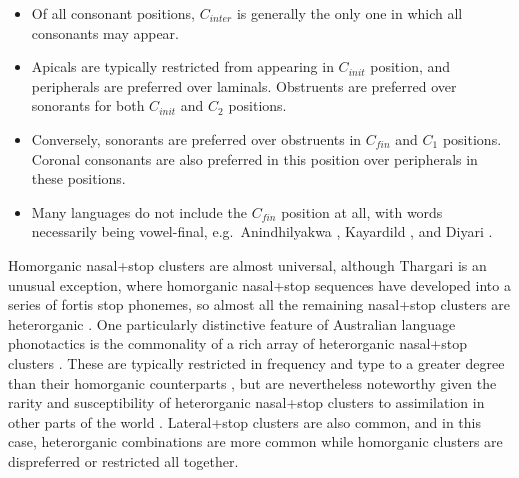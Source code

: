 \begin{itemize}
\tightlist
\item
  Of all consonant positions, \(C_{inter}\) is generally the only one in which all consonants may appear.
\item
  Apicals are typically restricted from appearing in \(C_{init}\) position, and peripherals are preferred over laminals. Obstruents are preferred over sonorants for both \(C_{init}\) and \(C_2\) positions.
\item
  Conversely, sonorants are preferred over obstruents in \(C_{fin}\) and \(C_1\) positions. Coronal consonants are also preferred in this position over peripherals in these positions.
\item
  Many languages do not include the \(C_{fin}\) position at all, with words necessarily being vowel-final, e.g.~Anindhilyakwa \autocite{van_egmond_enindhilyakwa_2012}, Kayardild \autocite{evans_grammar_1995}, and Diyari \autocite{austin_grammar_1981}.
\end{itemize}

Homorganic nasal+stop clusters are almost universal, although Thargari \autocite{klokeid_thargari_1969} is an unusual exception, where homorganic nasal+stop sequences have developed into a series of fortis stop phonemes, so almost all the remaining nasal+stop clusters are heterorganic \autocite{austin_grammar_1981}. One particularly distinctive feature of Australian language phonotactics is the commonality of a rich array of heterorganic nasal+stop clusters \autocites{baker_word_2014}{fletcher_sound_2014}{round_phonotactics_2021}. These are typically restricted in frequency and type to a greater degree than their homorganic counterparts \autocite[pp.~78--82]{hamilton_phonetic_1996}, but are nevertheless noteworthy given the rarity and susceptibility of heterorganic nasal+stop clusters to assimilation in other parts of the world \autocite[p.~144]{baker_word_2014}. Lateral+stop clusters are also common, and in this case, heterorganic combinations are more common while homorganic clusters are dispreferred or restricted all together.


